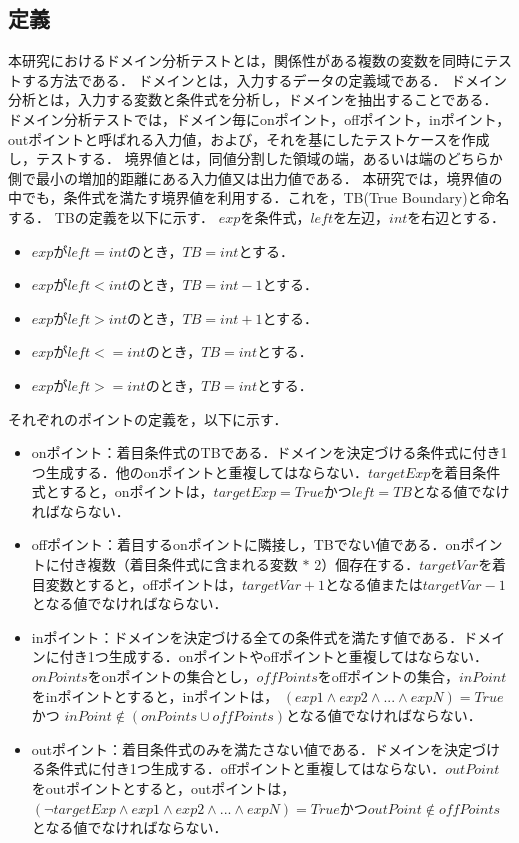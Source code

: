 \documentclass[uplatex, report, a4j, 10pt]{jsbook}
\begin{document}
\subsection{定義}\label{sec:define}
本研究におけるドメイン分析テストとは，関係性がある複数の変数を同時にテストする方法である\cite{izon}\cite{jstqb}．
ドメインとは，入力するデータの定義域である．
ドメイン分析とは，入力する変数と条件式を分析し，ドメインを抽出することである．
ドメイン分析テストでは，ドメイン毎にonポイント，offポイント，inポイント，outポイントと呼ばれる入力値，および，それを基にしたテストケースを作成し，テストする．
境界値とは，同値分割した領域の端，あるいは端のどちらか側で最小の増加的距離にある入力値又は出力値である\cite{jstqb}．
本研究では，境界値の中でも，条件式を満たす境界値を利用する．これを，TB(True Boundary)と命名する．
TBの定義を以下に示す．
$exp$を条件式，$left$を左辺，$int$を右辺とする．
\begin{itemize}
  \item $exp$が$left = int$のとき，$TB = int$とする．
  \item $exp$が$left < int$のとき，$TB = int - 1$とする．
  \item $exp$が$left > int$のとき，$TB = int + 1$とする．
  \item $exp$が$left <= int$のとき，$TB = int$とする．
  \item $exp$が$left >= int$のとき，$TB = int$とする．
\end{itemize}
それぞれのポイントの定義を，以下に示す．
\begin{itemize}
  \item onポイント：着目条件式のTBである．ドメインを決定づける条件式に付き1つ生成する．他のonポイントと重複してはならない．$targetExp$を着目条件式とすると，onポイントは，$targetExp = True$かつ$left = TB$となる値でなければならない．
  \item offポイント：着目するonポイントに隣接し，TBでない値である．onポイントに付き複数（着目条件式に含まれる変数 $*$ 2）個存在する．$targetVar$を着目変数とすると，offポイントは，$targetVar + 1$となる値または$targetVar - 1$となる値でなければならない．
  \item inポイント：ドメインを決定づける全ての条件式を満たす値である．ドメインに付き1つ生成する．onポイントやoffポイントと重複してはならない．$onPoints$をonポイントの集合とし，$offPoints$をoffポイントの集合，$inPoint$をinポイントとすると，inポイントは， $(exp1 \land exp2 \land ... \land expN) = True$ かつ $inPoint \notin (onPoints \cup offPoints)$となる値でなければならない．
  \item outポイント：着目条件式のみを満たさない値である．ドメインを決定づける条件式に付き1つ生成する．offポイントと重複してはならない．$outPoint$をoutポイントとすると，outポイントは，$ (\lnot targetExp \land exp1 \land exp2 \land ... \land expN) = True$かつ$outPoint \notin offPoints$となる値でなければならない．
\end{itemize}
\end{document}
